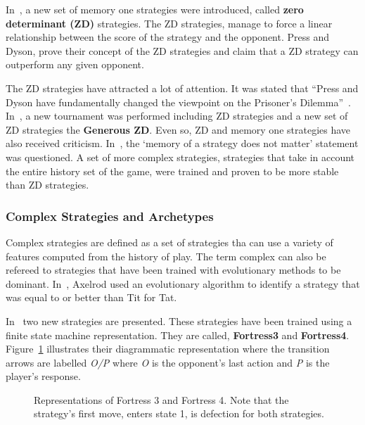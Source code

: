 \documentclass{article}
\begin{document}
In~\cite{Press2012}, a new set of memory one strategies were introduced, called
\textbf{zero determinant (ZD)} strategies. The ZD strategies,
manage to force a linear relationship between the score of the strategy
and the opponent. Press and Dyson, prove their concept of the ZD strategies
and claim that a ZD strategy can outperform any given opponent.

The ZD strategies have attracted a lot of attention. It was stated that
``Press and Dyson have fundamentally changed the viewpoint on the Prisoner's
Dilemma''~\cite{Stewart2012}. In~\cite{Stewart2012}, a new tournament was
performed including ZD strategies and a new set of ZD 
strategies the \textbf{Generous ZD}. Even so, ZD and memory one strategies have
also received criticism. In~\cite{Lee2015}, the `memory of a strategy does
not matter' statement was questioned. A set of more complex strategies,
strategies that take in account the entire history set of the game, were
trained and proven to be more stable than ZD strategies.

\subsubsection{Complex Strategies and Archetypes}

Complex strategies are defined as a set of strategies tha can use a variety of 
features computed from the history of play. The term complex can also be
refereed to strategies that have been trained with evolutionary methods to 
be dominant. In~\cite{Axelrod1987}, Axelrod used an evolutionary algorithm to 
identify a strategy that was equal to or better than Tit for Tat.

In~\cite{Ashlock2006b} two new strategies are presented. These strategies have
been trained using a finite state machine representation. They are called,
\textbf{Fortress3} and \textbf{Fortress4}. Figure~\ref{fig:fortress3_and_4}
illustrates their diagrammatic representation where the transition arrows are 
labelled \textit{O/P} where \textit{O} is the opponent's last action and \textit{P}
is the player's response.

\begin{figure}[!hbtp]
\centering
    \begin{subfigure}{.4\textwidth}
        
    \end{subfigure}
    \begin{subfigure}{.4\textwidth}\centering
        
     \end{subfigure}
     \caption{Representations of Fortress 3 and Fortress 4. Note that the
     strategy's first move, enters state 1, is defection for both strategies.}
     \label{fig:fortress3_and_4}
\end{figure}
\end{document}
